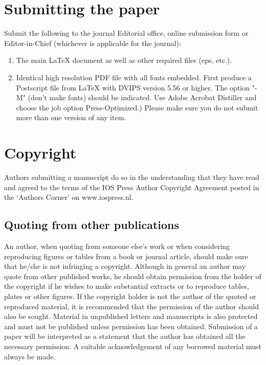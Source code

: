 \documentclass{iosart2c}
\begin{document}
\section{Submitting the paper}
Submit the following to the journal Editorial office, online submission form or Editor-in-Chief (whichever is applicable for the journal):

\begin{enumerate}
\item The main \LaTeX{} document as well as other required files (eps, etc.).
\item Identical high resolution PDF file with all fonts embedded. First produce a Postscript file from \LaTeX{}
with DVIPS version 5.56 or higher. The option "-M" (don't make fonts) should be indicated.
Use Adobe Acrobat Distiller and choose the job option Press-Optimized.) Please make sure you do not submit more than one version of any item.
\end{enumerate}

\section{Copyright}
Authors submitting a manuscript do so in the understanding that they have read and agreed to the terms of the IOS Press Author
Copyright Agreement posted in the `Authors Corner' on www.iospress.nl.

\subsection{Quoting from other publications}
An author, when quoting from someone else's work or when considering reproducing figures or tables from a book or journal article,
 should make sure that he/she is not infringing a copyright. Although in general an author may quote from other published works,
 he should obtain permission from the holder of the copyright if he wishes to make substantial extracts or to reproduce tables,
  plates or other figures. If the copyright holder is not the author of the quoted or reproduced material, it is recommended
  that the permission of the author should also be sought. Material in unpublished letters and manuscripts is also protected
  and must not be published unless permission has been obtained. Submission of a paper will be interpreted as a statement that
the author has obtained all the necessary permission. A suitable acknowledgement of any borrowed material must always be made.
\end{document}
